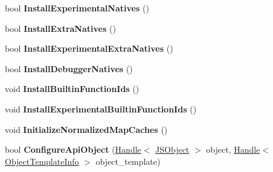 \begin{DoxyCompactItemize}
\item 
bool {\bfseries Install\+Experimental\+Natives} ()\hypertarget{classv8_1_1internal_1_1_b_a_s_e___e_m_b_e_d_d_e_d_ae511535c7f463ef079d1e64195f7359c}{}\label{classv8_1_1internal_1_1_b_a_s_e___e_m_b_e_d_d_e_d_ae511535c7f463ef079d1e64195f7359c}

\item 
bool {\bfseries Install\+Extra\+Natives} ()\hypertarget{classv8_1_1internal_1_1_b_a_s_e___e_m_b_e_d_d_e_d_ab34b13b4fb5e85861191f98de73b7ac9}{}\label{classv8_1_1internal_1_1_b_a_s_e___e_m_b_e_d_d_e_d_ab34b13b4fb5e85861191f98de73b7ac9}

\item 
bool {\bfseries Install\+Experimental\+Extra\+Natives} ()\hypertarget{classv8_1_1internal_1_1_b_a_s_e___e_m_b_e_d_d_e_d_a9ea9241b62cf87932900e27317a84598}{}\label{classv8_1_1internal_1_1_b_a_s_e___e_m_b_e_d_d_e_d_a9ea9241b62cf87932900e27317a84598}

\item 
bool {\bfseries Install\+Debugger\+Natives} ()\hypertarget{classv8_1_1internal_1_1_b_a_s_e___e_m_b_e_d_d_e_d_ac81a1eb2c5106dc6ed40ae81b35cdc4f}{}\label{classv8_1_1internal_1_1_b_a_s_e___e_m_b_e_d_d_e_d_ac81a1eb2c5106dc6ed40ae81b35cdc4f}

\item 
void {\bfseries Install\+Builtin\+Function\+Ids} ()\hypertarget{classv8_1_1internal_1_1_b_a_s_e___e_m_b_e_d_d_e_d_ae41d5ad29df7ceb2884e583467675f6e}{}\label{classv8_1_1internal_1_1_b_a_s_e___e_m_b_e_d_d_e_d_ae41d5ad29df7ceb2884e583467675f6e}

\item 
void {\bfseries Install\+Experimental\+Builtin\+Function\+Ids} ()\hypertarget{classv8_1_1internal_1_1_b_a_s_e___e_m_b_e_d_d_e_d_ae599f6f7e366a2fa1891df1767a6bc17}{}\label{classv8_1_1internal_1_1_b_a_s_e___e_m_b_e_d_d_e_d_ae599f6f7e366a2fa1891df1767a6bc17}

\item 
void {\bfseries Initialize\+Normalized\+Map\+Caches} ()\hypertarget{classv8_1_1internal_1_1_b_a_s_e___e_m_b_e_d_d_e_d_a58cd579b18f1d4c8e14dbd5e1a498744}{}\label{classv8_1_1internal_1_1_b_a_s_e___e_m_b_e_d_d_e_d_a58cd579b18f1d4c8e14dbd5e1a498744}

\item 
bool {\bfseries Configure\+Api\+Object} (\hyperlink{classv8_1_1internal_1_1_handle}{Handle}$<$ \hyperlink{classv8_1_1internal_1_1_j_s_object}{J\+S\+Object} $>$ object, \hyperlink{classv8_1_1internal_1_1_handle}{Handle}$<$ \hyperlink{classv8_1_1internal_1_1_object_template_info}{Object\+Template\+Info} $>$ object\+\_\+template)\hypertarget{classv8_1_1internal_1_1_b_a_s_e___e_m_b_e_d_d_e_d_a523994b875d79b174d21812c4146eb30}{}\label{classv8_1_1internal_1_1_b_a_s_e___e_m_b_e_d_d_e_d_a523994b875d79b174d21812c4146eb30}


\end{DoxyCompactItemize}
